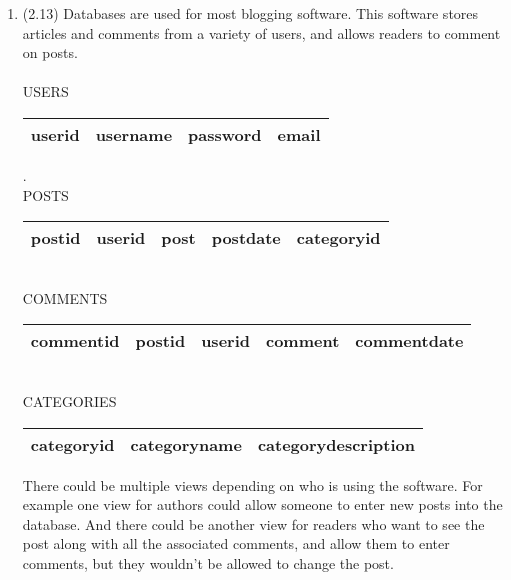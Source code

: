 \documentclass[11pt,fleqn]{article}
\begin{document}
\begin{enumerate}
\item (2.13) %
Databases are used for most blogging software. This software stores articles and comments from a variety of users, and allows readers to comment on posts. \\
\\
USERS\\
\begin{tabular}{|r|r|r|r|}
  \hline
	userid & username & password & email \\
  \hline
  \end{tabular}
.\\
POSTS\\
\begin{tabular}{|r|r|r|r|r|}
  \hline
	postid & userid & post & postdate & categoryid\\
  \hline
  \end{tabular}
\\
COMMENTS\\
\begin{tabular}{|r|r|r|r|r|}
  \hline
	commentid & postid & userid & comment & commentdate\\
  \hline
  \end{tabular}
\\
CATEGORIES\\
\begin{tabular}{|r|r|r|}
  \hline
	categoryid & categoryname & categorydescription \\
  \hline
  \end{tabular}

There could be multiple views depending on who is using the software. For example one view for authors could allow someone to enter new posts into the database. And there could be another view for readers who want to see the post along with all the associated comments, and allow them to enter comments, but they wouldn't be allowed to change the post. 

\end{enumerate}
\end{document}

